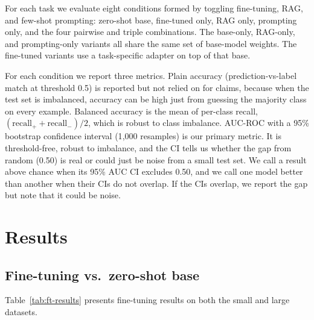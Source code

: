 \documentclass[11pt]{article}
\begin{document}
For each task we evaluate eight conditions formed by toggling
fine-tuning, RAG, and few-shot prompting: zero-shot base, fine-tuned
only, RAG only, prompting only, and the four pairwise and triple
combinations. The base-only, RAG-only, and prompting-only variants
all share the same set of base-model weights. The fine-tuned
variants use a task-specific adapter on top of that base.

For each condition we report three metrics. Plain accuracy
(prediction-vs-label match at threshold 0.5) is reported but not
relied on for claims, because when the test set is imbalanced,
accuracy can be high just from guessing the majority class on every
example. Balanced accuracy is the mean of per-class recall,
$(\mathrm{recall}_+ + \mathrm{recall}_-)/2$, which is robust to
class imbalance. AUC-ROC with a 95\% bootstrap confidence interval
(1{,}000 resamples) is our primary metric. It is threshold-free,
robust to imbalance, and the CI tells us whether the gap from random
(0.50) is real or could just be noise from a small test set. We
call a result above chance when its 95\% AUC CI excludes 0.50, and
we call one model better than another when their CIs do not overlap.
If the CIs overlap, we report the gap but note that it could be
noise.

\section{Results}
\label{sec:results}

\subsection{Fine-tuning vs.\ zero-shot base}

Table~\ref{tab:ft-results} presents fine-tuning results on both the
small and large datasets.
\end{document}
